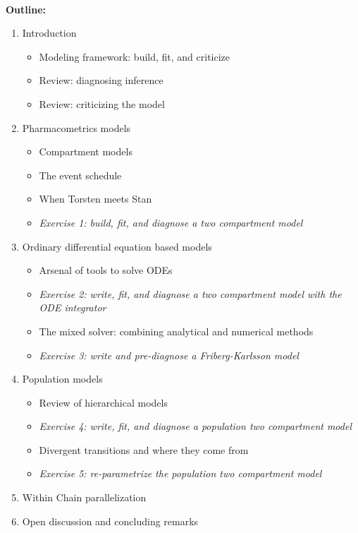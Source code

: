 \documentclass[12pt]{article}
\begin{document}
\ \\
\textbf{Outline:} \\
%
  \begin{enumerate}
   \item Introduction
   \begin{itemize}
     \item Modeling framework: build, fit, and criticize
     \item Review: diagnosing inference
     \item Review: criticizing the model
   \end{itemize}
   \item Pharmacometrics models
     \begin{itemize}
       \item Compartment models
       \item The event schedule
       \item When Torsten meets Stan
       \item \textit{Exercise 1: build, fit, and diagnose a two compartment model}
     \end{itemize}
   \item Ordinary differential equation based models
   \begin{itemize}
     \item Arsenal of tools to solve ODEs
     \item \textit{Exercise 2: write, fit, and diagnose a two compartment model with the ODE integrator}
     \item The mixed solver: combining analytical and numerical methods
     \item \textit{Exercise 3: write and pre-diagnose a Friberg-Karlsson model}
   \end{itemize}
   \item Population models
   \begin{itemize}
     \item Review of hierarchical models
     \item \textit{Exercise 4: write, fit, and diagnose a population two compartment model}
     \item Divergent transitions and where they come from
     \item \textit{Exercise 5: re-parametrize the population two compartment model}
   \end{itemize}
   \item Within Chain parallelization
   \item Open discussion and concluding remarks
 
 \end{enumerate}
\end{document}
